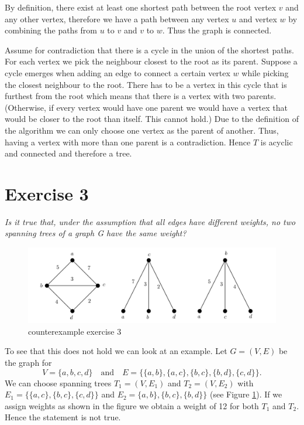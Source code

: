 \documentclass{article}
\begin{document}
By definition, there exist at least one shortest path between the root vertex $v$ and any other vertex, therefore we have a path between any vertex $u$ and vertex $w$ by combining the paths from $u$ to $v$ and $v$ to $w$. Thus the graph is connected.

Assume for contradiction that there is a cycle in the union of the shortest paths. For each vertex we pick the neighbour closest to the root as its parent. Suppose a cycle emerges when adding an edge to connect a certain vertex $w$ while picking the closest neighbour to the root. There has to be a vertex in this cycle that is furthest from the root which means that there is a vertex with two parents. (Otherwise, if every vertex would have one parent we would have a vertex that would be closer to the root than itself. This cannot hold.) Due to the definition of the algorithm we can only choose one vertex as the parent of another. 
Thus, having a vertex with more than one parent is a contradiction. Hence $T$ is acyclic and connected and therefore a tree.

\section*{Exercise 3}

\emph{Is it true that, under the assumption that all edges have different weights, no two spanning trees of a graph G have the same weight?}
\vspace{0.4cm}

\begin{figure}[h]
    \centering
    \includegraphics{Ex_3_project.png}
       \caption{counterexample exercise 3}
    \label{ex_3}
\end{figure}
To see that this does not hold we can look at an example. Let $G=(V,E)$ be the graph for
$$V = \{a,b,c,d\}\quad\text{and}\quad E = \{ \{a,b\}, \{a,c\}, \{b,c\}, \{b,d\}, \{c,d\} \}.$$ 
We can choose spanning trees $T_1 = (V, E_1)$ and $T_2 = (V, E_2)$ with $E_1 = \{ \{a,c\}, \{b,c\}, \{c,d\} \}$ and $E_2=\{a,b\}, \{b,c\}, \{b,d\} \}$ (see Figure \ref{ex_3}). If we assign weights as shown in the figure we obtain a weight of 12 for both $T_1$ and $T_2$. Hence the statement is not true.
\end{document}
